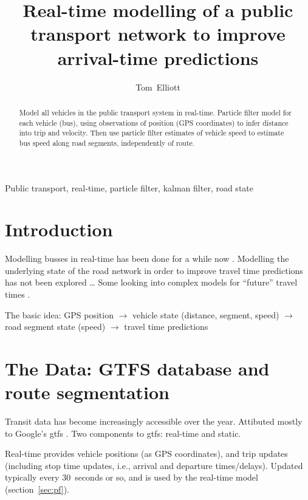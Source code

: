 \documentclass[draftcls,a4paper,onecolumn]{IEEEtran}\usepackage[]{graphicx}\usepackage[]{color}
\title{Real-time modelling of a public transport network to improve arrival-time predictions}
\author{Tom~Elliott}
\begin{document}
\maketitle


\begin{abstract}
  Model all vehicles in the public transport system in real-time.
  Particle filter model for each vehicle (bus),
  using observations of position (GPS coordinates) to infer distance into trip
  and velocity.
  Then use particle filter estimates of vehicle speed to estimate bus speed along
  road segments, independently of route.
 
\end{abstract}



\begin{IEEEkeywords}
  Public transport, real-time, particle filter, kalman filter, road state
\end{IEEEkeywords}

\section{Introduction}
\label{sec:intro}


Modelling busses in real-time has been done for a while now 
\cite{Cats_2015,Chen_2014,Hans_2015,Jeong_2005,TCRP_2003,Wessel_2016,
  Xinghao_2013}.
Modelling the underlying state of the road network in order to improve 
travel time predictions has not been explored \ldots
Some looking into complex models for ``future'' travel times 
\cite{Julio_2016,Xinghao_2013,Yichen_Zheng_2016,Yu_2011}.


The basic idea:
GPS position $\rightarrow$ 
vehicle state (distance, segment, speed) $\rightarrow$
road segment state (speed) $\rightarrow$
travel time predictions



\section{The Data: GTFS database and route segmentation}
\label{sec:data}

Transit data has become increasingly accessible over the year.
Attibuted mostly to Google's \gls{gtfs} \cite{GoogleDevelopers_2006}.
Two components to \gls{gtfs}: real-time and static.

Real-time provides vehicle positions (as GPS coordinates),
and trip updates (including stop time updates, 
i.e., arrival and departure times/delays).
Updated typically every 30~seconds or so,
and is used by the real-time model (section~\ref{sec:pf}).
\end{document}
